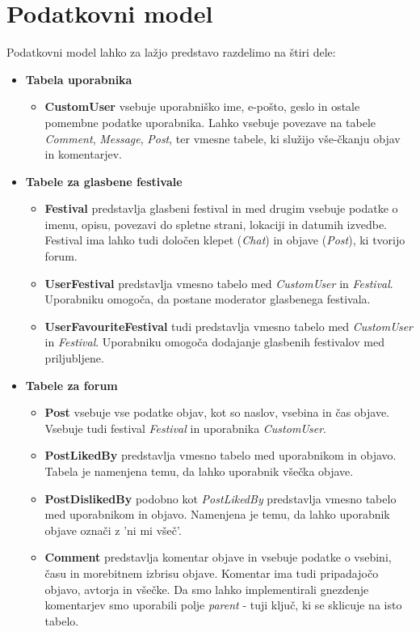 \documentclass[a4paper,12pt,openright]{book}
\begin{document}
\section{Podatkovni model}
Podatkovni model lahko za lažjo predstavo razdelimo na štiri dele:
\begin{itemize}
    \item \textbf{Tabela uporabnika}
        \begin{itemize}
            \item \textbf{CustomUser} vsebuje uporabniško ime, e-pošto, geslo in ostale pomembne podatke uporabnika. Lahko vsebuje povezave na tabele \textit{Comment}, \textit{Message}, \textit{Post}, ter vmesne tabele, ki služijo vše-čkanju objav in komentarjev.
        \end{itemize}
    \item \textbf{Tabele za glasbene festivale}
        \begin{itemize}
            \item \textbf{Festival} predstavlja glasbeni festival in med drugim vsebuje podatke o imenu, opisu, povezavi do spletne strani, lokaciji in datumih izvedbe. Festival ima lahko tudi določen klepet (\textit{Chat}) in objave (\textit{Post}), ki tvorijo forum.
            \item \textbf{UserFestival} predstavlja vmesno tabelo med \textit{CustomUser} in \textit{Festival}. Uporabniku omogoča, da postane moderator glasbenega festivala.
            \item \textbf{UserFavouriteFestival} tudi predstavlja vmesno tabelo med \textit{CustomUser} in \textit{Festival}. Uporabniku omogoča dodajanje glasbenih festivalov med priljubljene.
        \end{itemize}
    \item \textbf{Tabele za forum}
        \begin{itemize}
            \item \textbf{Post} vsebuje vse podatke objav, kot so naslov, vsebina in čas objave. Vsebuje tudi festival \textit{Festival} in uporabnika \textit{CustomUser}.  
            \item \textbf{PostLikedBy} predstavlja vmesno tabelo med uporabnikom in objavo. Tabela je namenjena temu, da lahko uporabnik všečka objave.
            \item \textbf{PostDislikedBy} podobno kot \textit{PostLikedBy} predstavlja vmesno tabelo med uporabnikom in objavo. Namenjena je temu, da lahko uporabnik objave označi z 'ni mi všeč'.
            \item \textbf{Comment} predstavlja komentar objave in vsebuje podatke o vsebini, času in morebitnem izbrisu objave. Komentar ima tudi pripadajočo objavo, avtorja in všečke. Da smo lahko implementirali gnezdenje komentarjev smo uporabili polje \textit{parent} - tuji ključ, ki se sklicuje na isto tabelo.

\end{itemize}
\end{itemize}
\end{document}
